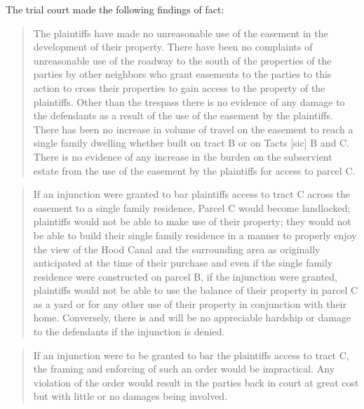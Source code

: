 The trial court made the following findings of fact:


\begin{quote}
The plaintiffs have made no unreasonable use of the easement in the development
of their property. There have been no complaints of unreasonable use of the
roadway to the south of the properties of the parties by other neighbors who
grant easements to the parties to this action to cross their properties to gain
access to the property of the plaintiffs. Other than the trespass there is no
evidence of any damage to the defendants as a result of the use of the easement
by the plaintiffs. There has been no increase in volume of travel on the
easement to reach a single family dwelling whether built on tract B or on Tacts
[sic] B and C. There is no evidence of any increase in the burden on the
subservient estate from the use of the easement by the plaintiffs for access to
parcel C.
\end{quote}


\begin{quote}
If an injunction were granted to bar plaintiffs access to tract C across the
easement to a single family residence, Parcel C would become landlocked;
plaintiffs would not be able to make use of their property; they would not be
able to build their single family residence in a manner to properly enjoy the
view of the Hood Canal and the surrounding area as originally anticipated at the
time of their purchase and even if the single family residence were constructed
on parcel B, if the injunction were granted, plaintiffs would not be able to use
the balance of their property in parcel C as a yard or for any other use of
their property in conjunction with their home. Conversely, there is and will be
no appreciable hardship or damage to the defendants if the injunction is
denied.
\end{quote}


\begin{quote}
If an injunction were to be granted to bar the plaintiffs access to tract C, the
framing and enforcing of such an order would be impractical. Any violation of
the order would result in the parties back in court at great cost but with
little or no damages being involved.
\end{quote}


